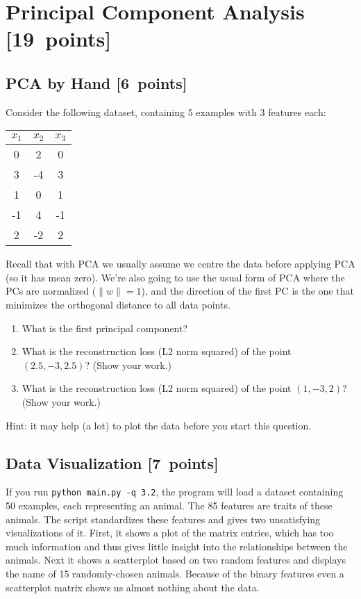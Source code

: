 \documentclass{article}
\newcommand{\blu}[1]{{\textcolor{blu}{#1}}}
\let\ask\blu
\newcommand\pts[1]{\textcolor{pointscolour}{[#1~points]}}
\newcommand{\norm}[1]{\lVert #1 \rVert}
\begin{document}
\clearpage
\section{Principal Component Analysis \pts{19}}
\subsection{PCA by Hand \pts{6}}

Consider the following dataset, containing 5 examples with 3 features each:
\begin{center}
  \begin{tabular}{ccc}
    $x_1$ & $x_2$ & $x_3$ \\
    \hline
     0 &  2 &  0 \\
     3 & -4 &  3 \\
     1 &  0 &  1 \\
    -1 &  4 & -1 \\
     2 & -2 &  2 \\
  \end{tabular}
\end{center}
Recall that with PCA we usually assume we centre the data before applying PCA (so it has mean zero).
We're also going to use the usual form of PCA where the PCs are normalized ($\norm{w} = 1$),
and the direction of the first PC is the one that minimizes the orthogonal distance to all data points.
\begin{enumerate}
  \item \ask{What is the first principal component?}
  \item \ask{What is the reconstruction loss (L2 norm squared) of the point $(2.5, -3, 2.5)$? (Show your work.)}
  \item \ask{What is the reconstruction loss (L2 norm squared) of the point $(1, -3, 2)$? (Show your work.)}
\end{enumerate}
Hint: it may help (a lot) to plot the data before you start this question.



\subsection{Data Visualization \pts{7}}

If you run \verb|python main.py -q 3.2|, the program will load a dataset containing 50 examples, each representing an animal.
The 85 features are traits of these animals.
The script standardizes these features and gives two unsatisfying visualizations of it.
First, it shows a plot of the matrix entries, which has too much information and thus gives little insight into the relationships between the animals.
Next it shows a scatterplot based on two random features and displays the name of 15 randomly-chosen animals.
Because of the binary features even a scatterplot matrix shows us almost nothing about the data.
\end{document}
